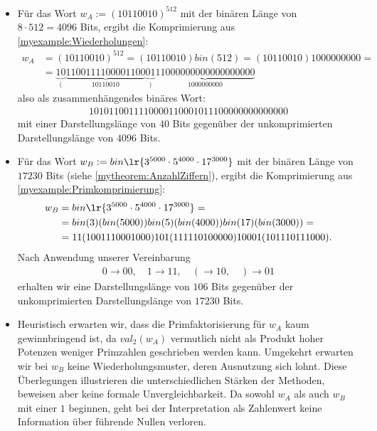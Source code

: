 \begin{myexample}\label{myexample:Unvergleichbarkeit}
	\leavevmode
\begin{itemize}
	\item Für das Wort $w_A := (10110010)^{512}$ mit der binären Länge von $8 \cdot 512 = 4096$ Bits, ergibt die Komprimierung aus \cref{myexample:Wiederholungen}:
\begin{align*}
	w_A &= (10110010)^{512} = (10110010)bin(512) = (10110010)1000000000 =\\
	&= \underbrace{10}_{(}\underbrace{1100111100001100}_{10110010}\underbrace{01}_{)}\underbrace{11000000000000000000}_{1000000000}
\end{align*}
also als zusammenhängendes binäres Wort:
\begin{align*}
	1010110011110000110001011100000000000000
\end{align*}
mit einer Darstellungslänge von $40$ Bits gegenüber der unkomprimierten Darstellungslänge von $4096$ Bits.
	\item Für das Wort $w_B := bin\lr{3^{5000}\cdot 5^{4000}\cdot 17^{3000}}$ mit der binären Länge von $17230$ Bits (siehe \cref{mytheorem:AnzahlZiffern}), ergibt die Komprimierung aus \cref{myexample:Primkomprimierung}:
\begin{align*}
	w_B &= bin\lr{3^{5000}\cdot 5^{4000}\cdot 17^{3000}} =\\
	&= bin(3)(bin(5000))bin(5)(bin(4000))bin(17)(bin(3000)) =\\
	&= 11(1001110001000)101(111110100000)10001(101110111000).
\end{align*}
Nach Anwendung unserer Vereinbarung
\begin{align*}
	0 \to 00, \quad 1 \to 11, \quad ( \to 10, \quad ) \to 01
\end{align*}
erhalten wir eine Darstellungslänge von $106$ Bits gegenüber der unkomprimierten Darstellungslänge von $17230$ Bits.
	\item Heuristisch erwarten wir, dass die Primfaktorisierung für $w_A$ kaum gewinnbringend ist, da $val_2(w_A)$ vermutlich nicht als Produkt hoher Potenzen weniger Primzahlen geschrieben werden kann. Umgekehrt erwarten wir bei $w_B$ keine Wiederholungsmuster, deren Ausnutzung sich lohnt. Diese Überlegungen illustrieren die unterschiedlichen Stärken der Methoden, beweisen aber keine formale Unvergleichbarkeit. Da sowohl $w_A$ als auch $w_B$ mit einer $1$ beginnen, geht bei der Interpretation als Zahlenwert keine Information über führende Nullen verloren.
\end{itemize}
\end{myexample}

